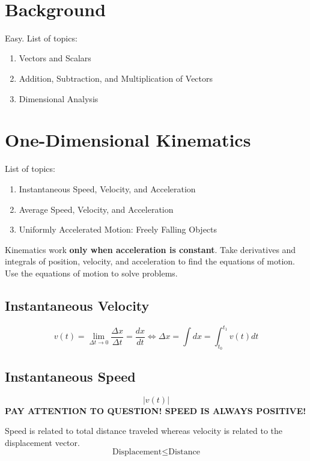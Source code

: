 \documentclass[article, 11pt]{article}
\title{
    \vspace{2in}
    \textmd{\textbf{\studyTitle}}
    \normalsize\vspace{0.1in}\\
    \vspace{0.1in}\large{\text{\class}} \\
    \vspace{0.1in}\text{\professor}\\
    \vspace{0.1in}\large\text{Midterm: \text{\examDate}}\\
    \vspace{3in}
}
\author{\name}
\date{}
\theoremstyle{definition}
\begin{document}
\maketitle
\thispagestyle{empty}
\pagebreak
\tableofcontents
\pagebreak

\section{Background}
Easy. List of topics:
\begin{enumerate}
    \item Vectors and Scalars
    \item Addition, Subtraction, and Multiplication of Vectors
    \item Dimensional Analysis
\end{enumerate}
\section{One-Dimensional Kinematics}
List of topics:
\begin{enumerate}
    \item Instantaneous Speed, Velocity, and Acceleration
    \item Average Speed, Velocity, and Acceleration
    \item Uniformly Accelerated Motion: Freely Falling Objects
\end{enumerate}
Kinematics work \textbf{only when acceleration is constant}. Take derivatives and integrals of position, velocity, and acceleration to find the equations of motion. Use the equations of motion to solve problems.
    \subsection{Instantaneous Velocity}
    \begin{equation}
        v(t) = \lim_{\Delta t \to 0} \frac{\Delta x}{\Delta t} = \frac{dx}{dt} \iff \Delta x = \int dx = \int_{t_0}^{t_1} v(t) dt
        \label{eq:instantaneous velocity}
    \end{equation}
    \subsection{Instantaneous Speed}
    \begin{equation}
        |v(t)|
    \end{equation}
    \textbf{PAY ATTENTION TO QUESTION! SPEED IS ALWAYS POSITIVE!}

    Speed is related to total distance traveled whereas velocity is related to the displacement vector.
    \begin{equation}
        \text{Displacement} \leq \text{Distance}
    \end{equation}
\end{document}
